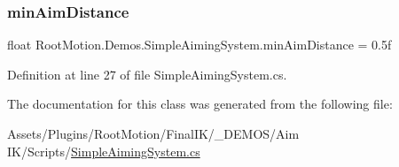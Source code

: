 \subsubsection{\texorpdfstring{min\+Aim\+Distance}{minAimDistance}}
{\footnotesize\ttfamily float Root\+Motion.\+Demos.\+Simple\+Aiming\+System.\+min\+Aim\+Distance = 0.\+5f}



Definition at line 27 of file Simple\+Aiming\+System.\+cs.



The documentation for this class was generated from the following file\+:\begin{DoxyCompactItemize}
\item 
Assets/\+Plugins/\+Root\+Motion/\+Final\+I\+K/\+\_\+\+D\+E\+M\+O\+S/\+Aim I\+K/\+Scripts/\mbox{\hyperlink{_simple_aiming_system_8cs}{Simple\+Aiming\+System.\+cs}}\end{DoxyCompactItemize}
